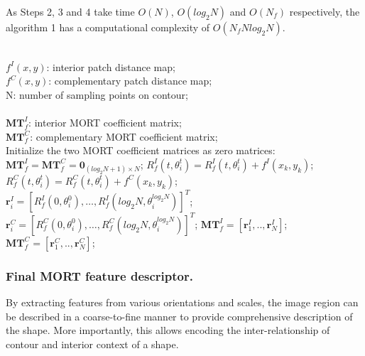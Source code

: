 \documentclass[letterpaper]{article} %
\begin{document}
As Steps 2, 3 and 4 take time $O(N)$, $O(log_2 N)$ and $O(N_f)$ respectively, the algorithm 1 has a computational complexity of $O(N_f N log_2 N)$.
\renewcommand{\algorithmicrequire}{ \textbf{Input:}}
\renewcommand{\algorithmicensure}{ \textbf{Output:}}
\begin{algorithm}[t]
\caption{Calculating discrete Multi-Orientation Region Transform}
\begin{algorithmic}[1]
\REQUIRE ~~\\
$f^I (x,y)$: interior patch distance map;\\
$f^C (x,y)$: complementary patch distance map;\\
N: number of sampling points on contour;\\
\ENSURE ~~\\
$\boldsymbol{MT}_f^I$: interior MORT coefficient matrix;\\
$\boldsymbol{MT}_f^C$: complementary MORT coefficient matrix;\\
\STATE Initialize the two MORT coefficient  matrices as zero matrices: $\boldsymbol{MT}_f^I= \boldsymbol{MT}_f^C = \boldsymbol{0}_{(log_2 N+1)\times N}$;
\STATE  $R_f^I (t,\theta_i^t )=R_f^I (t,\theta_i^t )+ f^I (x_k,y_k )$;
\STATE  $R_f^C (t,\theta_i^t )=R_f^C (t,\theta_i^t )+ f^C (x_k,y_k )$;
\ENDFOR
\ENDFOR
\STATE   $\boldsymbol{r}_i^I=[R_f^I (0,\theta_i^0 ),\dots,R_f^I (log_2 N,\theta_i^{log_2 N}) ]^T$;
\STATE  $\boldsymbol{r}_i^C=[R_f^C (0,\theta_i^0 ),\dots,R_f^C (log_2 N,\theta_i^{log_2 N}) ]^T$;
\ENDFOR
\STATE $\boldsymbol{MT}_f^I=[\boldsymbol{r}_1^I,..,\boldsymbol{r}_N^I]$;        \STATE $\boldsymbol{MT}_f^C=[\boldsymbol{r}_1^C,..,\boldsymbol{r}_N^C]$;
\label{code:recentEnd}
\end{algorithmic}
\end{algorithm}

\subsubsection{Final MORT feature descriptor.}

By extracting features from various orientations and scales, the image region can be described in a coarse-to-fine manner to provide comprehensive description of the shape. More importantly, this allows encoding the inter-relationship of contour and interior context of a shape.
\end{document}
